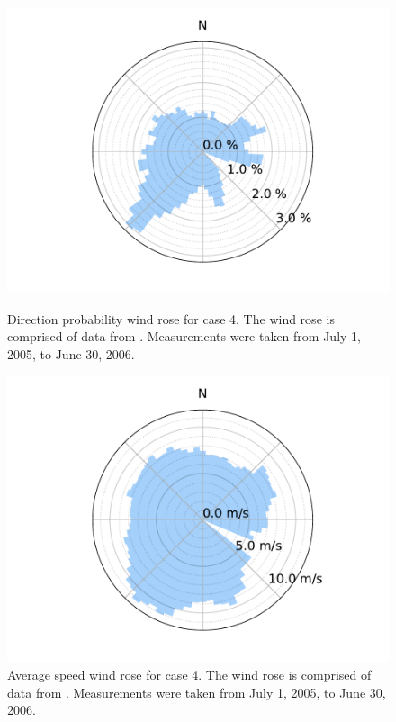 \documentclass[journal abbreviation, manuscript]{copernicus}
\begin{document}
	\begin{figure}[h!]
		\centering
		\begin{minipage}[t]{18pc}
			\centering
			\includegraphics[width=\textwidth, trim={1.5cm 0cm 1.5cm 0cm}, clip]{final_images/windroses/freqwindrose_72_dir.pdf}
			\caption{Direction probability wind rose for case 4. The wind rose is comprised of data from \cite{noordzeewind2006}. Measurements were taken from July 1, 2005, to June 30, 2006.}
			\label{fig:freqwindrose_72dir}
		\end{minipage} \hspace{1pc}%
		\begin{minipage}[t]{18pc}
			\centering
			\includegraphics[width=1.\textwidth, trim={1.5cm, 0cm, 1.5cm, 0cm}, clip]{final_images/windroses/speedwindrose_72_dir.pdf}
			\caption{Average speed wind rose for case 4. The wind rose is comprised of data from \cite{noordzeewind2006}. Measurements were taken from July 1, 2005, to June 30, 2006.}
			\label{fig:speedwindrose_72dir}
		\end{minipage}
	\end{figure}
\end{document}
